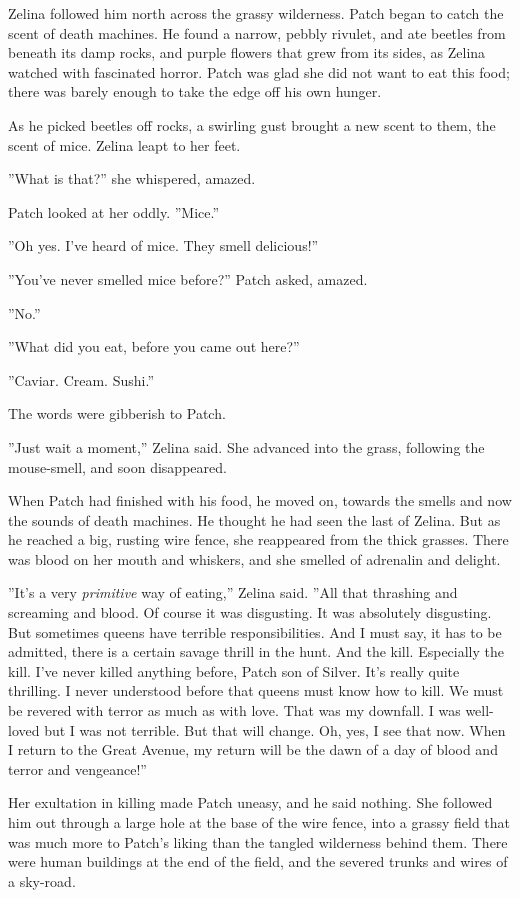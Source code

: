 \documentclass[12pt]{book}
\begin{document}
Zelina followed him north across the grassy wilderness. Patch began to catch the scent of death machines. He found a narrow, pebbly rivulet, and ate beetles from beneath its damp rocks, and purple flowers that grew from its sides, as Zelina watched with fascinated horror. Patch was glad she did not want to eat this food; there was barely enough to take the edge off his own hunger.

As he picked beetles off rocks, a swirling gust brought a new scent to them, the scent of mice. Zelina leapt to her feet.

''What is that?'' she whispered, amazed.

Patch looked at her oddly. ''Mice.''

''Oh yes. I've heard of mice. They smell delicious!''

''You've never smelled mice before?'' Patch asked, amazed.

''No.''

''What did you eat, before you came out here?''

''Caviar. Cream. Sushi.''

The words were gibberish to Patch.

''Just wait a moment,'' Zelina said. She advanced into the grass, following the mouse-smell, and soon disappeared.

When Patch had finished with his food, he moved on, towards the smells and now the sounds of death machines. He thought he had seen the last of Zelina. But as he reached a big, rusting wire fence, she reappeared from the thick grasses. There was blood on her mouth and whiskers, and she smelled of adrenalin and delight.

''It's a very {\it primitive} way of eating,'' Zelina said. ''All that thrashing and screaming and blood. Of course it was disgusting. It was absolutely disgusting. But sometimes queens have terrible responsibilities. And I must say, it has to be admitted, there is a certain savage thrill in the hunt. And the kill. Especially the kill. I've never killed anything before, Patch son of Silver. It's really quite thrilling. I never understood before that queens must know how to kill. We must be revered with terror as much as with love. That was my downfall. I was well-loved but I was not terrible. But that will change. Oh, yes, I see that now. When I return to the Great Avenue, my return will be the dawn of a day of blood and terror and vengeance!''

Her exultation in killing made Patch uneasy, and he said nothing. She followed him out through a large hole at the base of the wire fence, into a grassy field that was much more to Patch's liking than the tangled wilderness behind them. There were human buildings at the end of the field, and the severed trunks and wires of a sky-road.
\end{document}
